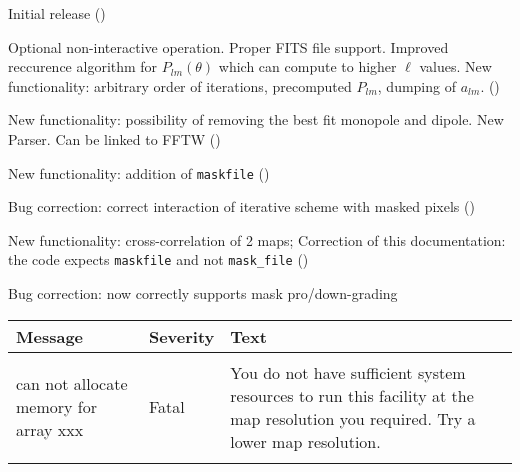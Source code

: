 \begin{release}
  \begin{relist}
    \item Initial release ()
    \item Optional non-interactive operation. Proper FITS file
    support. Improved reccurence algorithm for $P_{lm}(\theta)$ which can compute to higher $\ell$ values. New functionality: arbitrary order of iterations, precomputed
    $P_{lm}$, dumping of $a_{lm}$. ()
    \item New functionality: possibility of removing the best fit monopole
    and dipole. New Parser. Can be linked to FFTW ()
    \item New functionality: addition of {\tt{maskfile}} ()
    \item Bug correction: correct interaction of iterative scheme with masked pixels ()
    \item New functionality: cross-correlation of 2 maps; Correction of this documentation: the code expects {\tt maskfile} and
not {\tt mask\_file}  ()
    \item Bug correction: now correctly supports mask pro/down-grading
  \end{relist}
\end{release}

\begin{messages}
{
\begin{tabular}{p{0.25\hsize} p{0.1\hsize} p{0.35\hsize}} \hline  
  \textbf{Message} & \textbf{Severity} & \textbf{Text} \\ \hline
                   &                   &   \\ %
can not allocate memory for array xxx &  Fatal & You do not have
                   sufficient system resources to run this
                   facility at the map resolution you required. 
  Try a lower map resolution.  \\ 
                   &                   &   \\ \hline %
\end{tabular}
} 
\end{messages}

\newpage
